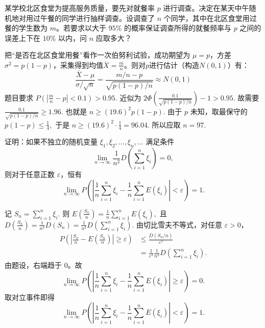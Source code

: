 \documentclass[lang=cn,11pt]{elegantbook}
\begin{document}
\begin{exercise}\label{exer:src-2009-a-06}\label{exer:src-paper4-iv-04}
某学校北区食堂为提高服务质量，要先对就餐率 \(p\) 进行调查。决定在某天中午随机地对用过午餐的同学进行抽样调查。设调查了 \(n\) 个同学，其中在北区食堂用过餐的学生数为 \(m\)。若要求以大于 \(95\%\) 的概率保证调查所得的就餐频率与 \(p\) 之间的误差上下在 \(10\%\) 以内，问 \(n\) 应取多大？
\end{exercise}
\begin{solution}
把“是否在北区食堂用餐”看作一次伯努利试验，成功期望为 \(\mu=p\)，方差$\sigma^2=p(1-p)$，采集得到均值$\overline{X}=\frac{m}{n}$。则对$p$进行估计（构造$N(0,1)$）有：
\[\frac{\overline{X}-\mu}{\sigma/\sqrt{n}}=\frac{m/n-p}{\sqrt{p(1-p)/n}}\approx N(0,1)\]
题目要求
\(
P\left(\left|\frac mn-p\right|<0.1\right)>0.95.
\)
近似为
\(
2\Phi\left(\frac{0.1}{\sqrt{p(1-p)/n}}\right)-1>0.95.
\)
故需要
\(
\frac{0.1}{\sqrt{p(1-p)/n}}\ge1.96.
\)
也就是
\(
n\ge (19.6)^2p(1-p).
\)
由于 \(p\) 未知，取最保守的
\(
p(1-p)\le\frac14,
\)
于是
\(
n\ge (19.6)^2\cdot\frac14=96.04.
\)
所以应取
\(
n=97.
\)
\end{solution}

\begin{exercise}\label{exer:src-2010-a-09}
证明：如果不独立的随机变量 \(\xi_1,\xi_2,\dots,\xi_n,\dots\) 满足条件
\[
\lim_{n\to\infty}\frac1{n^2}D\!\left(\sum_{i=1}^n \xi_i\right)=0,
\]
则对于任意正数 \(\varepsilon\)，恒有
\[
\lim_{n\to\infty}
P\left(
\left|
\frac1n\sum_{i=1}^n \xi_i
-
\frac1n\sum_{i=1}^n E(\xi_i)
\right|<\varepsilon
\right)=1.
\]
\end{exercise}
\begin{solution}
记
\(
S_n=\sum_{i=1}^n \xi_i.
\)
则
\(
E\left(\frac{S_n}{n}\right)=\frac1n\sum_{i=1}^n E(\xi_i),
\)
且
\(
D\left(\frac{S_n}{n}\right)
=\frac1{n^2}D(S_n)
=\frac1{n^2}D\!\left(\sum_{i=1}^n \xi_i\right).
\)
由切比雪夫不等式，对任意 \(\varepsilon>0\)，
\[
\begin{aligned}
P\left(
\left|
\frac{S_n}{n}
-
E\left(\frac{S_n}{n}\right)
\right|\ge\varepsilon
\right)
&\le
\frac{D(S_n/n)}{\varepsilon^2}\\
&=
\frac1{\varepsilon^2}
\frac1{n^2}D\!\left(\sum_{i=1}^n \xi_i\right).
\end{aligned}
\]
由题设，右端趋于 \(0\)。故
\[
\lim_{n\to\infty}
P\left(
\left|
\frac1n\sum_{i=1}^n \xi_i
-
\frac1n\sum_{i=1}^n E(\xi_i)
\right|\ge\varepsilon
\right)=0.
\]
取对立事件即得
\[
\lim_{n\to\infty}
P\left(
\left|
\frac1n\sum_{i=1}^n \xi_i
-
\frac1n\sum_{i=1}^n E(\xi_i)
\right|<\varepsilon
\right)=1.
\]
\end{solution}
\end{document}
